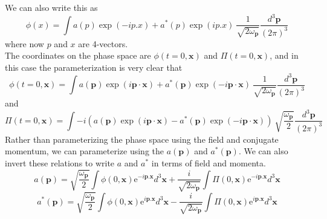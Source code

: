 \documentclass[11pt]{article}
\newcommand{\e}{\mathrm{e}}
\newcommand{\w}{\omega}
\numberwithin{equation}{section}
\begin{document}
    We can also write this as 
    \begin{equation}
        \phi(x) = \int a(p) \exp(-ip.x) + a^*(p) \exp(ip.x) ~\frac{1}{\sqrt{2\w_\textbf{p}}} \frac{d^3 \textbf{p}}{(2\pi)^3} 
    \end{equation}
    where now \(p\) and \(x\) are 4-vectors.\\

    The coordinates on the phase space are \(\phi(t=0, \textbf{x})\) and \(\Pi(t=0, \textbf{x})\), and in this case the parameterization is very clear that 
    \begin{equation}
        \phi(t=0, \textbf{x}) = \int a(\textbf{p}) \exp(i\textbf{p}\cdot \textbf{x}) + a^*(\textbf{p}) \exp(- i\textbf{p}\cdot \textbf{x}) ~ \frac{1}{\sqrt{2\w_\textbf{p}}} \frac{d^3 \textbf{p}}{(2\pi)^3}
    \end{equation}
    and 
    \begin{equation}
        \Pi(t=0, \textbf{x}) = \int -i \left(a(\textbf{p}) \exp(i\textbf{p}\cdot \textbf{x}) - a^*(\textbf{p}) \exp(- i\textbf{p}\cdot \textbf{x}) \right)~ \sqrt{\frac{\w_\textbf{p}}{2}} \frac{d^3 \textbf{p}}{(2\pi)^3}
    \end{equation}
    Rather than parameterizing the phase space using the field and conjugate momentum, we can parameterize using the \(a(\textbf{p})\) and \(a^*(\textbf{p})\). We can also invert these relations to write \(a\) and \(a^*\) in terms of field and momenta.
    \begin{equation}
        a(\textbf{p}) = \sqrt{\frac{\w_\textbf{p}}{2}}\int\phi(0, \textbf{x}) \e^{-i \textbf{p}. \textbf{x}}d^3\textbf{x} + \frac{i}{\sqrt{2\w_\textbf{p}}}\int \Pi(0, \textbf{x})\e^{-i \textbf{p}.\textbf{x}} d^3\textbf{x} 
    \end{equation}
    \begin{equation}
        a^*(\textbf{p}) = \sqrt{\frac{\w_\textbf{p}}{2}}\int\phi(0, \textbf{x}) \e^{i \textbf{p}. \textbf{x}}d^3\textbf{x} - \frac{i}{\sqrt{2\w_\textbf{p}}}\int \Pi(0, \textbf{x})\e^{i \textbf{p}.\textbf{x}} d^3\textbf{x} 
    \end{equation}\\
\end{document}
